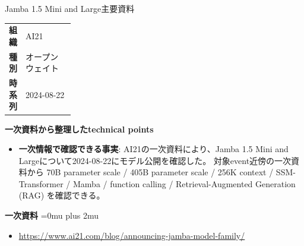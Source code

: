 \begin{technicalnote}{Jamba 1.5 Mini and Large}{主要資料}
\begingroup
\begin{tabularx}{\linewidth}{@{}>{\bfseries}p{0.22\linewidth}X@{}}
組織 & AI21 \\
種別 & オープンウェイト \\
時系列 & 2024-08-22 \\
\end{tabularx}
\smallskip
{\bfseries 一次資料から整理したtechnical points}
\begin{itemize}[leftmargin=1.5em,itemsep=0.35em]
\item \textbf{一次情報で確認できる事実}: AI21の一次資料により、Jamba 1.5 Mini and Largeについて2024-08-22にモデル公開を確認した。 対象event近傍の一次資料から 70B parameter scale / 405B parameter scale / 256K context / SSM-Transformer / Mamba / function calling / Retrieval-Augmented Generation (RAG) を確認できる。
\end{itemize}
\begin{minipage}{\linewidth}
\begin{samepage}
{\bfseries 一次資料}
\begingroup\sloppy
\Urlmuskip=0mu plus 2mu\relax
\begin{itemize}[leftmargin=1.5em,itemsep=0.25em]
\item {\scriptsize\url{https://www.ai21.com/blog/announcing-jamba-model-family/}}
\end{itemize}
\endgroup
\end{samepage}
\end{minipage}
\endgroup
\end{technicalnote}
\medskip

